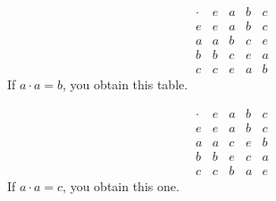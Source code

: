 \begin{enumerate}
    \begin{center}
        \begin{minipage}{0.45\textwidth}
            \centering
            \[
            \begin{array}{c||cccc}
                \cdot & e & a & b & c \\
                \hline \hline
                e & e & a & b & c \\
                a & a & b & c & e \\
                b & b & c & e & a \\
                c & c & e & a & b
            \end{array}
            \]
            If $a \cdot a = b$, you obtain this table.
        \end{minipage}
        \hfill
        \begin{minipage}{0.45\textwidth}
            \centering
            \[
            \begin{array}{c||cccc}
                \cdot & e & a & b & c \\
                \hline \hline
                e & e & a & b & c \\
                a & a & c & e & b \\
                b & b & e & c & a \\
                c & c & b & a & e
            \end{array}
            \]
            If $a \cdot a = c$, you obtain this one.
        \end{minipage}
    \end{center}


\end{enumerate}
